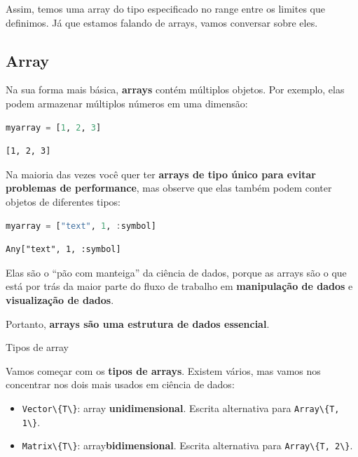 \documentclass[
  notoc %
]{tufte-book}
\makeatletter
\providecommand{\tightlist}{%
  \setlength{\itemsep}{0pt}\setlength{\parskip}{0pt}
}
\newcommand{\passthrough}[1]{#1}
\renewcommand\subsubsection{%
\@startsection{subsubsection}{3}{\z@ }{-3.25ex\@plus -1ex \@minus -.2ex}{1.5ex \@plus .2ex}{\normalfont \normalsize \bfseries }
}
\makeatother
\begin{document}
Assim, temos uma array do tipo especificado no range entre os limites
que definimos. Já que estamos falando de arrays, vamos conversar sobre
eles.

\hypertarget{sec:array}{%
\subsection{Array}\label{sec:array}}

Na sua forma mais básica, \textbf{arrays} contém múltiplos objetos. Por
exemplo, elas podem armazenar múltiplos números em uma dimensão:

\begin{lstlisting}[language=Julia]
myarray = [1, 2, 3]
\end{lstlisting}

\begin{lstlisting}[language=Output]
[1, 2, 3]
\end{lstlisting}

Na maioria das vezes você quer ter \textbf{arrays de tipo único para
evitar problemas de performance}, mas observe que elas também podem
conter objetos de diferentes tipos:

\begin{lstlisting}[language=Julia]
myarray = ["text", 1, :symbol]
\end{lstlisting}

\begin{lstlisting}[language=Output]
Any["text", 1, :symbol]
\end{lstlisting}

Elas são o ``pão com manteiga'' da ciência de dados, porque as arrays
são o que está por trás da maior parte do fluxo de trabalho em
\textbf{manipulação de dados} e \textbf{visualização de dados}.

Portanto, \textbf{arrays são uma estrutura de dados essencial}.

\hypertarget{sec:array_types}{%
\subsubsection{Tipos de array}\label{sec:array_types}}

Vamos começar com os \textbf{tipos de arrays}. Existem vários, mas vamos
nos concentrar nos dois mais usados em ciência de dados:

\begin{itemize}
\tightlist
\item
  \passthrough{\lstinline!Vector\{T\}!}: array \textbf{unidimensional}.
  Escrita alternativa para \passthrough{\lstinline!Array\{T, 1\}!}.
\item
  \passthrough{\lstinline!Matrix\{T\}!}: array\textbf{bidimensional}.
  Escrita alternativa para \passthrough{\lstinline!Array\{T, 2\}!}.
\end{itemize}
\end{document}
